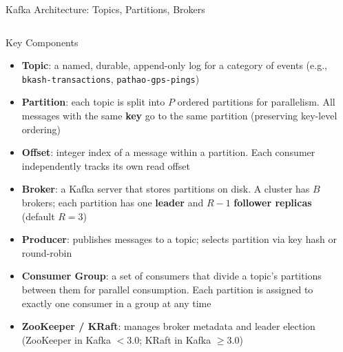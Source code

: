 \documentclass[aspectratio=169,10pt]{beamer}
\begin{document}
\begin{frame}{Kafka Architecture: Topics, Partitions, Brokers}
  \begin{columns}[T]
      \begin{block}{Key Components}
        {\small
        \begin{itemize}
          \item \textbf{Topic}: a named, durable, append-only log for a category of events (e.g., \texttt{bkash-transactions}, \texttt{pathao-gps-pings})
          \item \textbf{Partition}: each topic is split into $P$ ordered partitions for parallelism.  All messages with the same \textbf{key} go to the same partition (preserving key-level ordering)
          \item \textbf{Offset}: integer index of a message within a partition.  Each consumer independently tracks its own read offset
          \item \textbf{Broker}: a Kafka server that stores partitions on disk.  A cluster has $B$ brokers; each partition has one \textbf{leader} and $R-1$ \textbf{follower replicas} (default $R=3$)
          \item \textbf{Producer}: publishes messages to a topic; selects partition via key hash or round-robin
          \item \textbf{Consumer Group}: a set of consumers that divide a topic's partitions between them for parallel consumption.  Each partition is assigned to exactly one consumer in a group at any time
          \item \textbf{ZooKeeper / KRaft}: manages broker metadata and leader election (ZooKeeper in Kafka $<$3.0; KRaft in Kafka $\geq$3.0)
        \end{itemize}
        }
      \end{block}

      \begin{center}
\end{center}
\end{columns}
\end{frame}
\end{document}
